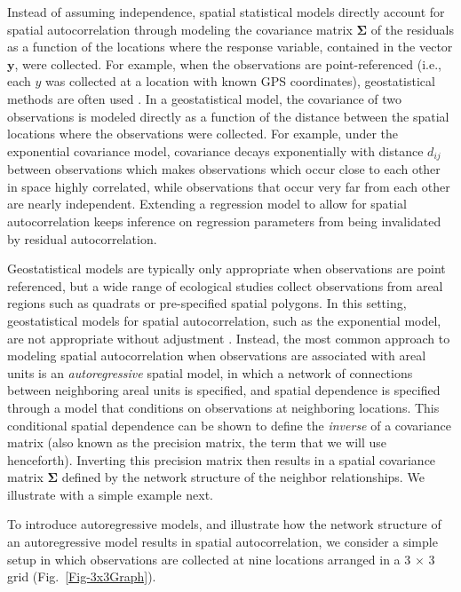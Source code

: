 Instead of assuming independence, spatial statistical models directly account for spatial autocorrelation through modeling the covariance matrix $\boldsymbol\Sigma$ of the residuals as a function of the locations where the response variable, contained in the vector $\mathbf{y}$, were collected.  For example, when the observations are point-referenced (i.e., each $y$ was collected at a location with known GPS coordinates), geostatistical methods are often used \citep[e.g.,][]{Turn:ONei:Conl:Conl:Hump:patt:1991}.  In a geostatistical model, the covariance of two observations is modeled directly as a function of the distance between the spatial locations where the observations were collected.  For example, under the exponential covariance model, covariance decays exponentially with distance $d_{ij}$ between observations
which makes observations which occur close to each other in space highly correlated, while observations that occur very far from each other are nearly independent.  Extending a regression model to allow for spatial autocorrelation \citep[e.g.,][]{Ver:Cres:Fish:Case:unce:2001} keeps inference on regression parameters from being invalidated by residual autocorrelation.

Geostatistical models are typically only appropriate when observations are point referenced, but a wide range of ecological studies collect observations from areal regions such as quadrats or pre-specified spatial polygons.  In this setting, geostatistical models for spatial autocorrelation, such as the exponential model, are not appropriate without adjustment \citep[but see ][]{Gotw:Youn:comb:2002}.  Instead, the most common approach to modeling spatial autocorrelation when observations are associated with areal units is an \emph{autoregressive} spatial model, in which a network of connections between neighboring areal units is specified, and spatial dependence is specified through a model that conditions on observations at neighboring locations.  This conditional spatial dependence can be shown to define the \emph{inverse} of a covariance matrix (also known as the precision matrix, the term that we will use henceforth).  Inverting this precision matrix then results in a spatial covariance matrix $\boldsymbol\Sigma$ defined by the network structure of the neighbor relationships. We illustrate with a simple example next.   

To introduce autoregressive models, and illustrate how the network structure of an autoregressive model results in spatial autocorrelation, we consider a simple setup in which observations are collected at nine locations arranged in a 3 $\times$ 3 grid (Fig.~\ref{Fig-3x3Graph}).



